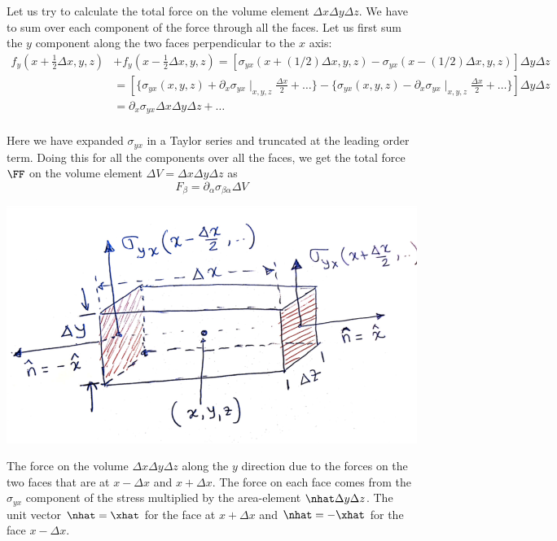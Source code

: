 \begin{fullwidth}
Let us try to calculate the total
force on the volume element $\Delta x\Delta y\Delta z$. 
We have to sum over each component of the
force through all the faces. Let us first sum the  $y$ component along
the two faces perpendicular to the $x$ axis:
\begin{subequations}
\begin{align}
f_y(x+\frac{1}{2}\Delta x,y,z)&+f_y(x-\frac{1}{2}\Delta x,y,z) 
= \left[ \sigma_{yx}(x+(1/2)\Delta x,y,z)-  \sigma_{yx}(x-(1/2)\Delta
  x,y,z) \right] \Delta y\Delta z \nonumber \\
&=\left[ \{\sigma_{yx}(x,y,z) + \partial_x \sigma_{yx}\mid_{x,y,z}\frac{\Delta x}{2} +\ldots\}
            -  \{\sigma_{yx}(x,y,z) - \partial_x
  \sigma_{yx}\mid_{x,y,z}\frac{\Delta x}{2}+ \ldots\}  \right]\Delta y \Delta z
  \nonumber \\
&= \partial_x \sigma_{yx} \Delta x\Delta y\Delta z + \ldots \nonumber \\
\end{align}
\end{subequations} 
\end{fullwidth}
Here we have expanded $\sigma_{yx}$ in a Taylor series and truncated
at the leading order term.  Doing this for all the components over all
the faces, we get the total force $\FF$ on the volume element 
$\Delta V = \Delta x\Delta y\Delta z$ as 
\begin{equation}
F_{\beta} = \partial_{\alpha}\sigma_{\beta\alpha}\Delta V 
\label{A1.2divs}
\end{equation}
%
 \begin{marginfigure}
  \includegraphics{figures/DivStress.png}
 \caption{ The force on the volume $\Delta x\Delta y\Delta z$ along
   the $y$ direction due to the forces on the two faces that are at
   $x-\Delta x$ and $x+\Delta x$. The force on each face comes from the
   $\sigma_{yx}$  component of the stress multiplied by the 
   area-element  $\nhat\Delta y\Delta z$. The unit vector $\nhat =
   \xhat$ for the face at $x+\Delta x$ and $\nhat=-\xhat$ for the face
 $x-\Delta x$. }
  \label{fig:DivStress}
\end{marginfigure}
